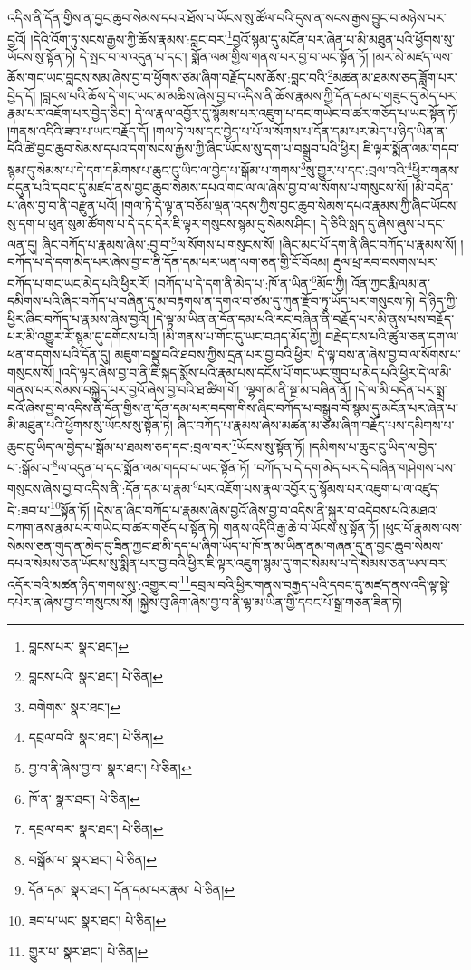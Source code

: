འདིས་ནི་དོན་གྱིས་ན་བྱང་ཆུབ་སེམས་དཔའ་ཐོས་པ་ཡོངས་སུ་ཚོལ་བའི་དུས་ན་སངས་རྒྱས་བྱུང་བ་མཉེས་པར་བྱའོ། །དེའི་འོག་ཏུ་སངས་རྒྱས་ཀྱི་ཆོས་རྣམས་:བླང་བར་\footnote{བླངས་པར་  སྣར་ཐང་། }བྱའོ་སྙམ་དུ་མངོན་པར་ཞེན་པ་མི་མཐུན་པའི་ཕྱོགས་སུ་ཡོངས་སུ་སྟོན་ཏེ། དེ་སྤང་བ་ལ་འདུན་པ་དང་། སྨོན་ལམ་གྱིས་གནས་པར་བྱ་བ་ཡང་སྟོན་ཏོ། །མར་མེ་མཛད་ལས་ཆོས་གང་ཡང་བླངས་སམ་ཞེས་བྱ་བ་ཕྱོགས་ཙམ་ཞིག་བརྗོད་པས་ཆོས་:བླང་བའི་\footnote{བླངས་པའི་  སྣར་ཐང་།  པེ་ཅིན། }མཚན་མ་ཐམས་ཅད་ཟློག་པར་བྱེད་དོ། །བླངས་པའི་ཆོས་དེ་གང་ཡང་མ་མཆིས་ཞེས་བྱ་བ་འདིས་ནི་ཆོས་རྣམས་ཀྱི་དོན་དམ་པ་གཟུང་དུ་མེད་པར་རྣམ་པར་འཇོག་པར་བྱེད་ཅིང་། དེ་ལ་རྣལ་འབྱོར་དུ་སྙོམས་པར་འཇུག་པ་དང་གཡེང་བ་ཚར་གཅོད་པ་ཡང་སྟོན་ཏོ། །གནས་འདིའི་ཟབ་པ་ཡང་བརྗོད་དོ། །གལ་ཏེ་ལས་དང་བྱེད་པ་པོ་ལ་སོགས་པ་དོན་དམ་པར་མེད་པ་ཉིད་ཡིན་ན་དེའི་ཚེ་བྱང་ཆུབ་སེམས་དཔའ་དག་སངས་རྒྱས་ཀྱི་ཞིང་ཡོངས་སུ་དག་པ་བསྒྲུབ་པའི་ཕྱིར། ཇི་ལྟར་སྨོན་ལམ་གདབ་སྙམ་དུ་སེམས་པ་དེ་དག་དམིགས་པ་ཆུང་ངུ་ཡིད་ལ་བྱེད་པ་སྒོམ་པ་གགས་\footnote{བགེགས་  སྣར་ཐང་། }སུ་གྱུར་པ་དང་:བྲལ་བའི་\footnote{དབྲལ་བའི་  སྣར་ཐང་།  པེ་ཅིན། }ཕྱིར་གནས་བདུན་པའི་དབང་དུ་མཛད་ནས་བྱང་ཆུབ་སེམས་དཔའ་གང་ལ་ལ་ཞེས་བྱ་བ་ལ་སོགས་པ་གསུངས་སོ། །མི་བདེན་པ་ཞེས་བྱ་བ་ནི་བརྫུན་པའོ། །གལ་ཏེ་དེ་ལྟ་ན་བཅོམ་ལྡན་འདས་ཀྱིས་བྱང་ཆུབ་སེམས་དཔའ་རྣམས་ཀྱི་ཞིང་ཡོངས་སུ་དག་པ་ཕུན་སུམ་ཚོགས་པ་དེ་དང་དེར་ཇི་ལྟར་གསུངས་སྙམ་དུ་སེམས་ཤིང་། དེ་ཅིའི་སླད་དུ་ཞེས་ཞུས་པ་དང་ལན་དུ། ཞིང་བཀོད་པ་རྣམས་ཞེས་:བྱ་བ་\footnote{བྱ་བ་ནི་ཞེས་བྱ་བ་  སྣར་ཐང་།  པེ་ཅིན། }ལ་སོགས་པ་གསུངས་སོ། །ཞིང་མང་པོ་དག་ནི་ཞིང་བཀོད་པ་རྣམས་སོ། །བཀོད་པ་དེ་དག་མེད་པར་ཞེས་བྱ་བ་ནི་དོན་དམ་པར་ཡན་ལག་ཅན་གྱི་ངོ་བོའམ། རྡུལ་ཕྲ་རབ་བསགས་པར་བཀོད་པ་གང་ཡང་མེད་པའི་ཕྱིར་རོ། །བཀོད་པ་དེ་དག་ནི་མེད་པ་:ཁོ་ན་ཡིན་\footnote{ཁོ་ན་  སྣར་ཐང་།  པེ་ཅིན། }མོད་ཀྱི། འོན་ཀྱང་རྨི་ལམ་ན་དམིགས་པའི་ཞིང་བཀོད་པ་བཞིན་དུ་མ་བརྟགས་ན་དགའ་བ་ཙམ་དུ་ཀུན་རྫོབ་ཏུ་ཡོད་པར་གསུངས་ཏེ། དེ་ཉིད་ཀྱི་ཕྱིར་ཞིང་བཀོད་པ་རྣམས་ཞེས་བྱའོ། །དེ་ལྟ་མ་ཡིན་ན་དོན་དམ་པའི་རང་བཞིན་ནི་བརྗོད་པར་མི་ནུས་པས་བརྗོད་པར་མི་འགྱུར་རོ་སྙམ་དུ་དགོངས་པའོ། །མི་གནས་པ་གོང་དུ་ཡང་བཤད་མོད་ཀྱི། བརྗེད་ངས་པའི་ཚུལ་ཅན་དག་ལ་ཕན་གདགས་པའི་དོན་དུ། མཇུག་བསྡུ་བའི་ཐབས་ཀྱིས་དྲན་པར་བྱ་བའི་ཕྱིར། དེ་ལྟ་བས་ན་ཞེས་བྱ་བ་ལ་སོགས་པ་གསུངས་སོ། །འདི་ལྟར་ཞེས་བྱ་བ་ནི་ཇི་སྐད་སྨོས་པའི་རྣམ་པས་དངོས་པོ་གང་ཡང་གྲུབ་པ་མེད་པའི་ཕྱིར་དེ་ལ་མི་གནས་པར་སེམས་བསྐྱེད་པར་བྱའོ་ཞེས་བྱ་བའི་ཐ་ཚིག་གོ། །ལྷག་མ་ནི་སྔ་མ་བཞིན་ནོ། །དེ་ལ་མི་བདེན་པར་སྨྲ་བའོ་ཞེས་བྱ་བ་འདིས་ནི་དོན་གྱིས་ན་དོན་དམ་པར་བདག་གིས་ཞིང་བཀོད་པ་བསྒྲུབ་བོ་སྙམ་དུ་མངོན་པར་ཞེན་པ་མི་མཐུན་པའི་ཕྱོགས་སུ་ཡོངས་སུ་སྟོན་ཏེ། ཞིང་བཀོད་པ་རྣམས་ཞེས་མཚན་མ་ཙམ་ཞིག་བརྗོད་པས་དམིགས་པ་ཆུང་ངུ་ཡིད་ལ་བྱེད་པ་སྒོམ་པ་ཐམས་ཅད་དང་:བྲལ་བར་\footnote{དབྲལ་བར་  སྣར་ཐང་།  པེ་ཅིན། }ཡོངས་སུ་སྟོན་ཏོ། །དམིགས་པ་ཆུང་ངུ་ཡིད་ལ་བྱེད་པ་:སྒོམ་པ་\footnote{བསྒོམ་པ་  སྣར་ཐང་།  པེ་ཅིན། }ལ་འདུན་པ་དང་སྨོན་ལམ་གདབ་པ་ཡང་སྟོན་ཏོ། །བཀོད་པ་དེ་དག་མེད་པར་དེ་བཞིན་གཤེགས་པས་གསུངས་ཞེས་བྱ་བ་འདིས་ནི་:དོན་དམ་པ་རྣམ་\footnote{དོན་དམ་  སྣར་ཐང་། དོན་དམ་པར་རྣམ་  པེ་ཅིན། }པར་འཇོག་པས་རྣལ་འབྱོར་དུ་སྙོམས་པར་འཇུག་པ་ལ་འཛུད་དེ་:ཟབ་པ་\footnote{ཟབ་པ་ཡང་  སྣར་ཐང་།  པེ་ཅིན། }སྟོན་ཏོ། །དེས་ན་ཞིང་བཀོད་པ་རྣམས་ཞེས་བྱའོ་ཞེས་བྱ་བ་འདིས་ནི་སྐུར་བ་འདེབས་པའི་མཐའ་བཀག་ནས་རྣམ་པར་གཡེང་བ་ཚར་གཅོད་པ་སྟོན་ཏེ། གནས་འདིའི་རྒྱ་ཆེ་བ་ཡོངས་སུ་སྟོན་ཏོ། །ཕུང་པོ་རྣམས་ལས་སེམས་ཅན་གུད་ན་མེད་དུ་ཟིན་ཀྱང་ཐ་མི་དད་པ་ཞིག་ཡོད་པ་ཁོ་ན་མ་ཡིན་ནམ་གཞན་དུ་ན་བྱང་ཆུབ་སེམས་དཔའ་སེམས་ཅན་ཡོངས་སུ་སྨིན་པར་བྱ་བའི་ཕྱིར་ཇི་ལྟར་འཇུག་སྙམ་དུ་གང་སེམས་པ་དེ་སེམས་ཅན་ཡལ་བར་འདོར་བའི་མཚན་ཉིད་གགས་སུ་:འགྱུར་བ་\footnote{གྱུར་པ་  སྣར་ཐང་།  པེ་ཅིན། }དབྲལ་བའི་ཕྱིར་གནས་བརྒྱད་པའི་དབང་དུ་མཛད་ནས་འདི་ལྟ་སྟེ་དཔེར་ན་ཞེས་བྱ་བ་གསུངས་སོ། །སྐྱེས་བུ་ཞིག་ཞེས་བྱ་བ་ནི་ལྷ་མ་ཡིན་གྱི་དབང་པོ་སྒྲ་གཅན་ཟིན་ཏེ། 